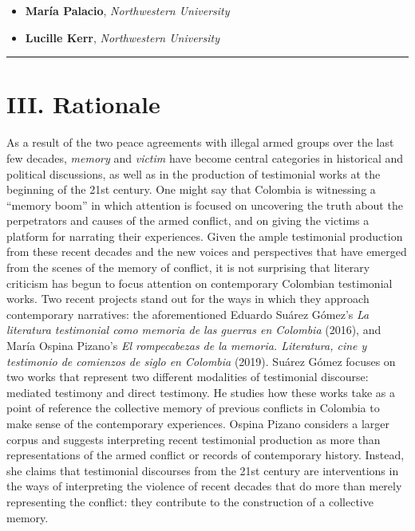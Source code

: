\documentclass[
  11pt,
,
onecolumn,
openany
]{book}
\providecommand{\tightlist}{%
  \setlength{\itemsep}{0pt}\setlength{\parskip}{0pt}}
\begin{document}
\begin{itemize}
\tightlist
\item
  \textbf{María Palacio}, \emph{Northwestern University}
\item
  \textbf{Lucille Kerr}, \emph{Northwestern University}
\end{itemize}

\begin{center}\rule{0.5\linewidth}{0.5pt}\end{center}

\hypertarget{iii.-rationale}{%
\chapter{III. Rationale}\label{iii.-rationale}}

As a result of the two peace agreements with illegal armed groups over the
last few decades, \emph{memory} and \emph{victim} have become central
categories in historical and political discussions, as well as in the
production of testimonial works at the beginning of the 21st century. One
might say that Colombia is witnessing a ``memory boom'' in which attention is
focused on uncovering the truth about the perpetrators and causes of the armed
conflict, and on giving the victims a platform for narrating their
experiences. Given the ample testimonial production from these recent decades
and the new voices and perspectives that have emerged from the scenes of the
memory of conflict, it is not surprising that literary criticism has begun to
focus attention on contemporary Colombian testimonial works. Two recent
projects stand out for the ways in which they approach contemporary
narratives: the aforementioned Eduardo Suárez Gómez's \emph{La literatura
testimonial como memoria de las guerras en Colombia} (2016), and María Ospina
Pizano's \emph{El rompecabezas de la memoria. Literatura, cine y testimonio de
comienzos de siglo en Colombia} (2019). Suárez Gómez focuses on two works that
represent two different modalities of testimonial discourse: mediated
testimony and direct testimony. He studies how these works take as a point of
reference the collective memory of previous conflicts in Colombia to make
sense of the contemporary experiences. Ospina Pizano considers a larger corpus
and suggests interpreting recent testimonial production as more than
representations of the armed conflict or records of contemporary history.
Instead, she claims that testimonial discourses from the 21st century are
interventions in the ways of interpreting the violence of recent decades that
do more than merely representing the conflict: they contribute to the
construction of a collective memory.
\end{document}
